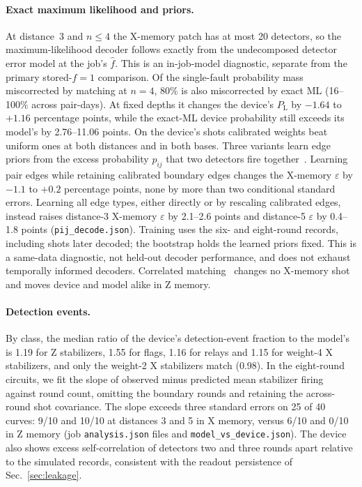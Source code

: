 \documentclass[aps,pra,reprint,nofootinbib,longbibliography,floatfix,showkeys]{revtex4-2}
\newcommand{\eps}{\varepsilon}
\newcommand{\PL}{P_{\mathrm{L}}}
\newcommand{\fhat}{\hat f}
\begin{document}
\paragraph*{Exact maximum likelihood and priors.}
At distance~3 and $n \le 4$ the X-memory patch has at most 20 detectors, so the maximum-likelihood decoder follows exactly from the undecomposed detector error model at the job's $\fhat$.
This is an in-job-model diagnostic, separate from the primary stored-$f=1$ comparison.
Of the single-fault probability mass miscorrected by matching at $n = 4$, 80\% is also miscorrected by exact ML (16--100\% across pair-days).
At fixed depths it changes the device's $\PL$ by $-1.64$ to $+1.16$ percentage points, while the exact-ML device probability still exceeds its model's by 2.76--11.06 points.
On the device's shots calibrated weights beat uniform ones at both distances and in both bases.
Three variants learn edge priors from the excess probability $p_{ij}$ that two detectors fire together~\cite{google2021exponential}.
Learning pair edges while retaining calibrated boundary edges changes the X-memory $\eps$ by $-1.1$ to $+0.2$ percentage points, none by more than two conditional standard errors.
Learning all edge types, either directly or by rescaling calibrated edges, instead raises distance-3 X-memory $\eps$ by 2.1--2.6 points and distance-5 $\eps$ by 0.4--1.8 points (\texttt{pij\_decode.json}).
Training uses the six- and eight-round records, including shots later decoded; the bootstrap holds the learned priors fixed.
This is a same-data diagnostic, not held-out decoder performance, and does not exhaust temporally informed decoders.
Correlated matching~\cite{fowler2013optimal} changes no X-memory shot and moves device and model alike in Z memory.

\paragraph*{Detection events.}
By class, the median ratio of the device's detection-event fraction to the model's is 1.19 for Z stabilizers, 1.55 for flags, 1.16 for relays and 1.15 for weight-4 X stabilizers, and only the weight-2 X stabilizers match (0.98).
In the eight-round circuits, we fit the slope of observed minus predicted mean stabilizer firing against round count, omitting the boundary rounds and retaining the across-round shot covariance.
The slope exceeds three standard errors on 25 of 40 curves: 9/10 and 10/10 at distances 3 and 5 in X memory, versus 6/10 and 0/10 in Z memory (job \texttt{analysis.json} files and \texttt{model\_vs\_device.json}).
The device also shows excess self-correlation of detectors two and three rounds apart relative to the simulated records, consistent with the readout persistence of Sec.~\ref{sec:leakage}.
\end{document}
